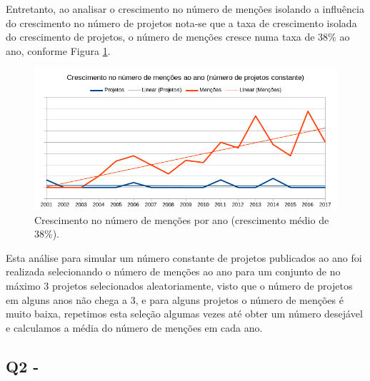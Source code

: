 
Entretanto, ao analisar o crescimento no número de menções isolando a influência do
crescimento no número de projetos nota-se que a taxa de crescimento isolada do
crescimento de projetos, o número de menções cresce numa taxa de 38\% ao ano,
conforme Figura \ref{mentions-trend}.

\begin{figure}[h]
  \center
  \includegraphics[scale=0.6]{imagens/mentions-trend.png}
  \caption{Crescimento no número de menções por ano (crescimento médio de 38\%).}
  \label{mentions-trend}
\end{figure}

Esta análise para simular um número constante de projetos publicados ao ano foi
realizada selecionando o número de menções ao ano para um conjunto de no máximo
3 projetos selecionados aleatoriamente, visto que o número de projetos em
alguns anos não chega a 3, e para alguns projetos o número de menções é muito
baixa, repetimos esta seleção algumas vezes até obter um número desejável e
calculamos a média do número de menções em cada ano.


\subsection{Q2 - \QuestaoDois} %

